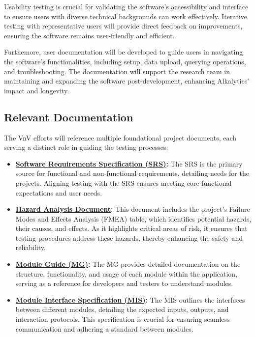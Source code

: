 \documentclass[12pt, titlepage]{article}
\begin{document}
\noindent Usability testing is crucial for validating the software’s
accessibility and interface to ensure users with diverse technical backgrounds
can work effectively. Iterative testing with representative users will provide
direct feedback on improvements, ensuring the software remains user-friendly and
efficient. \newline 

\noindent Furthemore, user documentation will be developed to guide users in
navigating the software’s functionalities, including setup, data upload,
querying operations, and troubleshooting. The documentation will support the
research team in maintaining and expanding the software post-development,
enhancing Alkalytics' impact and longevity.

\subsection{Relevant Documentation}

The VnV efforts will reference multiple foundational project documents, each
serving a distinct role in guiding the testing processes:

\begin{itemize}
    \item
    \textbf{\href{https://github.com/SumanyaG/Alkalytics/blob/f856af96669275cc29428a8f2cd4b863e4523ff6/docs/SRS/SRS.pdf}{Software
    Requirements Specification (SRS)}:} The SRS is the primary source for
    functional and non-functional requirements, detailing needs for the
    projects. Aligning testing with the SRS ensures meeting core functional
    expectations and user needs.
    
    \item
    \textbf{\href{https://github.com/SumanyaG/Alkalytics/blob/main/docs/HazardAnalysis/HazardAnalysis.pdf}{Hazard
    Analysis Document}:} This document includes the project’s Failure Modes and
    Effects Analysis (FMEA) table, which identifies potential hazards, their
    causes, and effects. As it highlights critical areas of risk, it ensures
    that testing procedures address these hazards, thereby enhancing the safety
    and reliability.

    \item
    \textbf{\href{https://github.com/SumanyaG/Alkalytics/blob/main/docs/Design/SoftArchitecture/MG.pdf}{Module
    Guide (MG)}:} The MG provides detailed documentation on the structure,
    functionality, and usage of each module within the application, serving as a
    reference for developers and testers to understand modules.

    \item
    \textbf{\href{https://github.com/SumanyaG/Alkalytics/blob/main/docs/Design/SoftDetailedDes/MIS.pdf}{Module
    Interface Specification (MIS)}:} The MIS outlines the interfaces between
    different modules, detailing the expected inputs, outputs, and interaction
    protocols. This specification is crucial for ensuring seamless communication
    and adhering a standard between modules.
\end{itemize}
\end{document}
